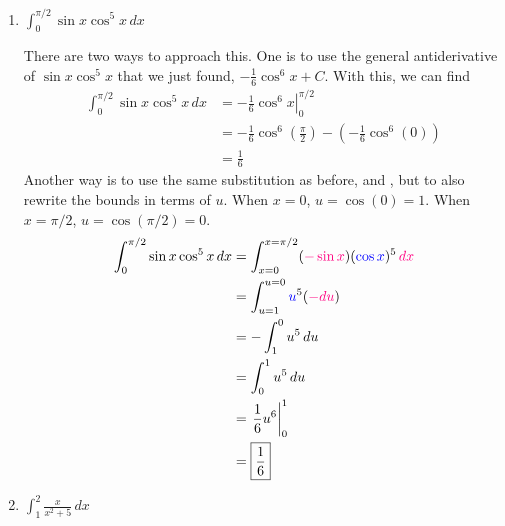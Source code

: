 \documentclass[main]{subfiles}
\begin{document}
\begin{enumerate}
\begin{enumerate}
  \item


    \begin{problem}[\nstretch{2}]
      $\displaystyle \int_0^{\pi/2} \sin x \cos^5 x \, dx$
    \end{problem}

    \begin{solution}
    There are two ways to approach this. One is to use
    the general antiderivative of $\sin x \cos^5 x$ that we just found,
      $-\frac{1}{6}\cos^6 x +C$. With this, we can find
      \begin{align*}
          \int_0^{\pi/2} \sin x \cos^5 x \,dx &= 
          \left. -\frac{1}{6}\cos^6 x\right|_0^{\pi/2} \\
          &= -\frac{1}{6}\cos^6\left(\frac{\pi}{2}\right) - 
          \left(-\frac{1}{6}\cos^6(0)\right) \\
          &= \boxed{\frac{1}{6}}
      \end{align*}
      Another way is to use the same substitution as before, 
      and , but to also rewrite the bounds in
      terms of $u$. When $x=0$, $u=\cos(0)=1$. When $x=\pi/2$,
      $u=\cos(\pi/2)=0$. 
      \begin{align*}
        \int_0^{\pi/2} \sin x \cos^5 x\,dx 
        & = \int_{x=0}^{x=\pi/2} (\subd{-\sin x}) (\sub{\cos
          x})^5\,\subd{dx} \\ 
        &= \int_{u=1}^{u=0} \sub{u}^5 (\subd{-du}) \\
        &= - \int_1^0 u^5\,du \\
        &= \int_0^1 u^5\,du\\
        &= \left.\frac{1}{6} u^6\right|_0^1 \\
        &= \boxed{\frac{1}{6}}
      \end{align*}
    \end{solution}

  \item 
    \begin{problem}[\vfill]
      $\displaystyle \int_1^2 \frac{x}{x^2+5}\,dx$
    \end{problem}


\end{enumerate}
\end{enumerate}
\end{document}
